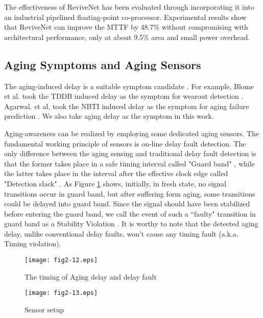 The effectiveness of ReviveNet has been evaluated through incorporating it into an industrial pipelined floating-point co-processor. Experimental results show that ReviveNet can improve the MTTF by 48.7\% without compromising with architectural performance, only at about 9.5\% area and small power overhead.


\subsection{Aging Symptoms and Aging Sensors}
The aging-induced delay is a suitable symptom candidate \cite{Self-calibrating_07} \cite{failure_prediction_07} \cite{failure_prediction2_08}. For example, Blome et al. took the TDDB induced delay as the symptom for wearout detection \cite{Self-calibrating_07}. Agarwal. et al, took the NBTI induced delay as the symptom for aging failure prediction \cite{failure_prediction_07}\cite{failure_prediction2_08}. We also take aging delay as the symptom in this work.

Aging-awareness can be realized by employing some dedicated aging sensors. The fundamental working principle of sensors is on-line delay fault detection. The only difference between the aging sensing and traditional delay fault detection is that the former takes place in a safe timing interval called "Guard band" \cite{failure_prediction_07}, while the latter takes place in the interval after the effective clock edge called "Detection slack" \cite{SVFD_09}. As Figure \ref{agingdelay} shows, initially, in fresh state, no signal transitions occur in guard band, but after suffering form aging, some transitions could be delayed into guard band. Since the signal should have been stabilized before entering the guard band, we call the event of such a ``faulty" transition in guard band as a Stability Violation \cite{SVFD_09}. It is worthy to note that the detected aging delay, unlike conventional delay faults, won't cause any timing fault (a.k.a. Timing violation).

\begin{figure}[t]
\centering
\texttt{[image: fig2-12.eps]}%
   \caption{The timing of Aging delay and delay fault}\label{agingdelay}
\end{figure}

\begin{figure}[t]
\centering
\texttt{[image: fig2-13.eps]}%
\vspace{-0.5cm}
   \caption{Sensor setup}\label{setupsonsor}
\end{figure}

